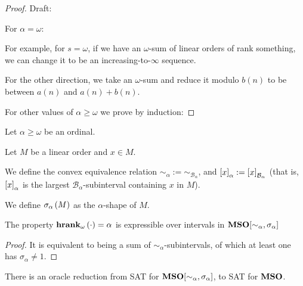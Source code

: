 \begin{proof}
  Draft:

  For $\alpha = \omega$:

  For example, for $s = \omega$, if we have an $\omega$-sum
  of linear orders of rank something, we can change it
  to be an increasing-to-$\infty$ sequence.

  For the other direction, we take an $\omega$-sum and reduce it modulo
  $b(n)$ to be between $a(n)$ and $a(n) + b(n)$.

  For other values of $\alpha \ge \omega$ we prove by induction:
\end{proof}

\begin{definition}
  Let $\alpha \ge \omega$ be an ordinal.

  Let $M$ be a linear order and $x \in M$.

  We define the convex equivalence relation $\sim_\alpha := \sim_{\mathcal{B}_{\alpha}}$,
  and $\left[ {x} \right]_{\alpha} := \left[ {x} \right]_{\mathcal{B}_{\alpha}}$ (that is,
  $\left[ {x} \right]_{\alpha}$ is the largest $\mathcal{B}_{\alpha}$-subinterval
  containing $x$ in $M$).

  We define $\sigma_{\alpha} \left( {M} \right)$ as
  the $\alpha$-shape of $M$.
\end{definition}


\begin{lemma}
  The property
  $\mathbf{hrank}_{\omega}\left( \cdot \right) = \alpha$ is expressible over intervals
  in $\mathbf{MSO}[\sim_{\alpha}, \sigma_{\alpha}]$
\end{lemma}

\begin{proof}
  It is equivalent to being a sum of $\sim_{\alpha}$-subintervals,
  of which at least one has $\sigma_{\alpha} \ne 1$.
\end{proof}

\begin{theorem}
  There is an oracle reduction from SAT for $\mathbf{MSO}[\sim_{\alpha}, \sigma_{\alpha}]$,
  to SAT for $\mathbf{MSO}$.
\end{theorem}


